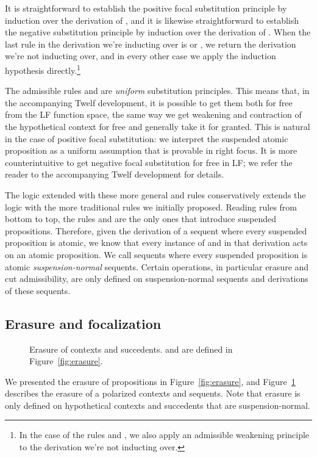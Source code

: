 \documentclass[acmtocl]{robtrans}\pdfoutput=1
\begin{document}
It is straightforward to establish the positive focal substitution
principle by induction over the derivation of , and it is likewise straightforward to establish
the negative substitution principle by induction over the derivation
of . When the last rule in the
derivation we're inducting over is  or , we
return the derivation we're not inducting over, and in every other
case we apply the induction hypothesis directly.\footnote{In the case
  of the rules  and , we also apply an
  admissible weakening principle to the derivation we're not inducting
  over.}

The admissible rules  and  are {\it
  uniform} substitution principles. This means that, in the
accompanying Twelf development, it is possible to get them both for
free from the LF function space, the same way we get weakening 
and contraction of the
hypothetical context for free and generally take it for granted. This
is natural in the case of positive focal substitution: we interpret
the suspended atomic proposition  as a uniform assumption
that  is provable in right focus. It is more counterintuitive to
get negative focal substitution for free in LF; we refer the reader to
the accompanying Twelf development for details. 

The logic extended with these more general  and  rules conservatively extends the logic with the more
traditional rules we initially proposed. Reading rules from bottom to
top, the rules  and  are the only ones that introduce
suspended propositions. Therefore, given the derivation of a sequent
where every suspended proposition is atomic, we know that every
instance of  and  in that derivation acts on an
atomic proposition. We call sequents where every suspended proposition
is atomic {\it suspension-normal} sequents. Certain operations, in
particular erasure and cut admissibility, are only defined on
suspension-normal sequents and derivations of these sequents.


\subsection{Erasure and focalization}

\begin{figure}

\caption{Erasure of contexts and succedents.  and
   are defined in Figure~\ref{fig:erasure}.}
\label{fig:erasure-ctx}
\end{figure}

We presented the erasure of propositions in Figure~\ref{fig:erasure},
and Figure~\ref{fig:erasure-ctx} describes the erasure of a polarized
contexts and sequents. Note that erasure is only defined on
hypothetical contexts  and succedents  that are
suspension-normal.
 
\end{document}
